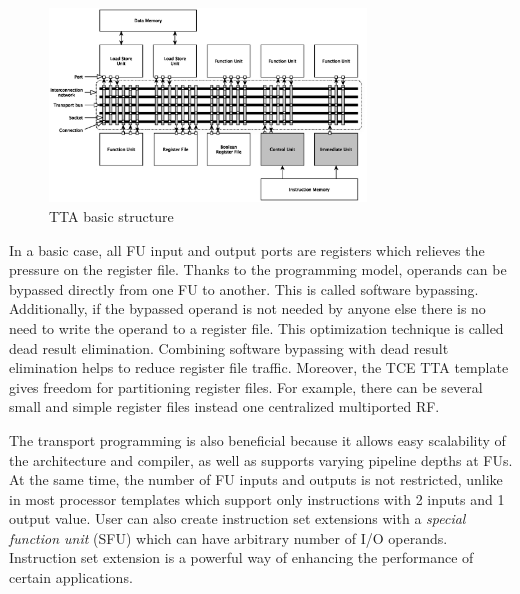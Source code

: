 \documentclass[twoside]{tceusermanual}
\begin{document}

\begin{figure}
  \begin{center} 
  \includegraphics[width=0.75\textwidth]{eps/tta}
    \caption{TTA basic structure} 
    \label{fig:tta1} 
  \end{center}
\end{figure}

In a basic case, all FU input and output ports are registers which
relieves the pressure on the register file. Thanks to the programming
model, operands can be bypassed directly from one FU to another. This
is called software bypassing. Additionally, if the bypassed operand is
not needed by anyone else there is no need to write the operand to a
register file. This optimization technique is called dead result
elimination. Combining software bypassing with dead result elimination
helps to reduce register file traffic.  Moreover, the TCE TTA template
gives freedom for partitioning register files. For example, there can
be several small and simple register files instead one centralized
multiported RF.

The transport programming is also beneficial because it allows easy
scalability of the architecture and compiler, as well as supports
varying pipeline depths at FUs. At the same time, the number of FU
inputs and outputs is not restricted, unlike in most processor
templates which support only instructions with 2 inputs and 1
output value. User can also create instruction set extensions with a
\textit{special function unit} (SFU) which can have arbitrary number
of I/O operands. Instruction set extension is a powerful way of
enhancing the performance of certain applications.
\end{document}
